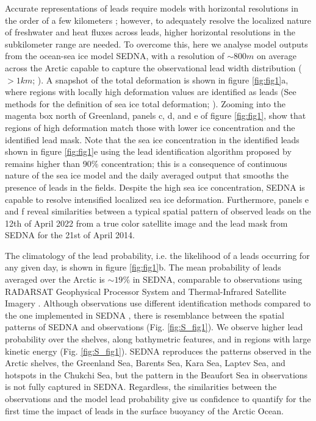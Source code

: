 \documentclass[lineno,sn-basic]{sn-jnl}%
\begin{document}
Accurate representations of leads require models with horizontal resolutions in the order of a few kilometers \citep{Bouchat_sea_ice_rheology_2022, Wang_leads_2016}; however, to adequately resolve the localized nature of freshwater and heat fluxes across leads, higher horizontal resolutions in the subkilometer range are needed. To overcome this, here we analyse model outputs from the ocean-sea ice model SEDNA, with a resolution of $\sim 800m$ on average across the Arctic capable to capture the observational lead width distribution ($>1km$; \citealp{Wernecke_Lead_2015}). 
A snapshot of the total deformation is shown in figure \ref{fig:fig1}a, where regions with locally high deformation values are identified as leads (See methods for the definition of sea ice total deformation; \citealp{Hutter_identification_2019, kwok_deformation_2001,Ruffieux_pack_lead_1995}). Zooming into the magenta box north of Greenland, panels c, d, and e of figure \ref{fig:fig1}, show that regions of high deformation match those with lower ice concentration and the identified lead mask. 
Note that the sea ice concentration in the identified leads shown in figure \ref{fig:fig1}e using the lead identification algorithm proposed by \citet{Hutter_identification_2019} remains higher than 90\% concentration; this is a consequence of continuous nature of the sea ice model and the daily averaged output that smooths the presence of leads in the fields. 
Despite the high sea ice concentration, SEDNA is capable to resolve intensified localized sea ice deformation. Furthermore, panels e and f reveal similarities between a typical spatial pattern of observed leads on the 12th of April 2022 from a true color satellite image and the lead mask from SEDNA for the 21st of April 2014.

The climatology of the lead probability, i.e. the likelihood of a leads occurring for any given day, is shown in figure \ref{fig:fig1}b. The mean probability of leads averaged over the Arctic is $\sim 19\%$ in SEDNA, comparable to observations using RADARSAT Geophysical Processor System and Thermal-Infrared Satellite Imagery \citep{Wernecke_Lead_2015,Willmes_leads_currents_2023}. Although observations use different identification methods compared to the one implemented in SEDNA \citep{Hutter_identification_2019}, there is resemblance between the spatial patterns of SEDNA and observations (Fig. \ref{fig:S_fig1}). We observe higher lead probability over the shelves, along bathymetric features, and in regions with large kinetic energy (Fig. \ref{fig:S_fig1}). SEDNA reproduces the patterns observed in the Arctic shelves, the Greenland Sea, Barents Sea, Kara Sea, Laptev Sea, and hotspots in the Chukchi Sea, but the pattern in the Beaufort Sea in observations is not fully captured in SEDNA. Regardless, the similarities between the observations and the model lead probability give us confidence to quantify for the first time the impact of leads in the surface buoyancy of the Arctic Ocean.
\end{document}
